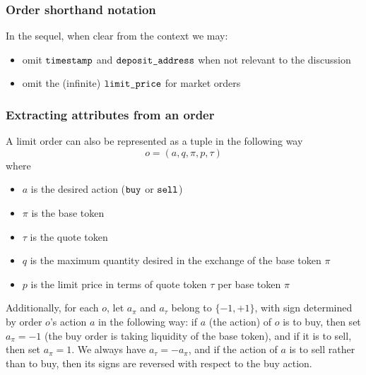 \documentclass[11pt, reqno]{amsart}
\theoremstyle{definition}
\theoremstyle{remark}
\newcommand{\timestamp}{\textnormal{\texttt{timestamp}}}
\newcommand{\limitprice}{\textnormal{\texttt{limit\_price}}}
\newcommand{\depositaddress}{\textnormal{\texttt{deposit\_address}}}
\newcommand{\buy}{\textnormal{\texttt{buy}}}
\newcommand{\sell}{\textnormal{\texttt{sell}}}
\begin{document}
\subsubsection{Order shorthand notation}
In the sequel, when clear from the context we may:
\begin{itemize}
\item omit $\timestamp$ and $\depositaddress$ when not relevant to the
      discussion
\item omit the (infinite) $\limitprice$ for market orders
\end{itemize}

\subsubsection{Extracting attributes from an order}
A limit order can also be represented as a tuple in the following way
\[
    o = (a, q, \pi, p, \tau)
\]
where
\begin{itemize}
    \item $a$ is the desired action ($\buy$ or $\sell$)
    \item $\pi$ is the base token
    \item $\tau$ is the quote token
    \item $q$ is the maximum quantity desired in the exchange of the base token
          $\pi$
    \item $p$ is the limit price in terms of quote token $\tau$ per base token
          $\pi$
\end{itemize}
Additionally, for each $o$, let $a_\pi$ and $a_\tau$ belong to
$\{-1, +1\}$, with sign determined by order $o$'s action $a$ in the following
way: if $a$ (the action) of $o$ is to buy, then set $a_\pi = -1$ (the buy
order is taking liquidity of the base token), and if it is to sell, then
set $a_\pi = 1$. We always have $a_\tau = -a_\pi$, and if the action
of $a$ is to sell rather than to buy, then its signs are reversed with
respect to the buy action.
\end{document}
